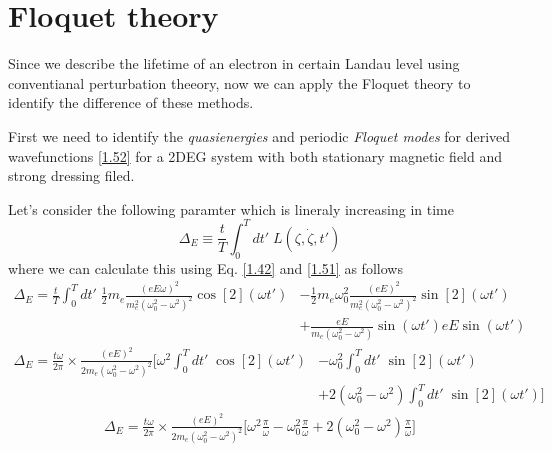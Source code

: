 \section{Floquet theory}

Since we describe the lifetime of an electron in certain Landau level using conventianal perturbation theeory, now we can apply the Floquet theory to identify the difference of these methods.

\noindent
First we need to identify the \textit{quasienergies} and periodic \textit{Floquet modes} for derived wavefunctions \eqref{1.52} for a 2DEG system with both stationary magnetic field and strong dressing filed.

\noindent
Let's consider the following paramter which is lineraly increasing in time
\begin{equation} \label{3.1}
  \Delta_E \equiv \frac{t}{T} \int_0^T dt' \; L(\zeta,\dot{\zeta},t')
\end{equation}
where we can calculate this using Eq. \eqref{1.42} and \eqref{1.51} as follows
\begin{equation} \label{3.2}
  \begin{aligned}
    \Delta_E =
    \frac{t}{T} \int_0^T dt' \;
    \frac{1}{2}m_e \frac{(eE\omega)^2}{m_e^2(\omega_0^2 - \omega^2)^2} \cos[2](\omega t')
    & - \frac{1}{2}m_e\omega_0^2 \frac{(eE)^2}{m_e^2(\omega_0^2 - \omega^2)^2} \sin[2](\omega t') \\
    & +
    \frac{eE}{m_e(\omega_0^2 - \omega^2)} \sin(\omega t') eE \sin(\omega t')
  \end{aligned}
\end{equation}
\begin{equation} \label{3.3}
  \begin{aligned}
    \Delta_E =
    \frac{t\omega}{2\pi} \times
    \frac{(eE)^2}{2m_e(\omega_0^2 - \omega^2)^2}
    \bigg[
    \omega^2
    \int_0^T dt' \; \cos[2](\omega t')
    & -
    \omega_0^2
    \int_0^T dt'\; \sin[2](\omega t') \\
    & +
    2(\omega_0^2 - \omega^2) \int_0^T dt'\; \sin[2](\omega t')
    \bigg]
  \end{aligned}
\end{equation}
\begin{equation} \label{3.4}
  \begin{aligned}
    \Delta_E =
    \frac{t\omega}{2\pi} \times
    \frac{(eE)^2}{2m_e(\omega_0^2 - \omega^2)^2}
    \bigg[
    \omega^2
    \frac{\pi}{\omega}
    -
    \omega_0^2
    \frac{\pi}{\omega}
    +
    2(\omega_0^2 - \omega^2) \frac{\pi}{\omega}
    \bigg]
  \end{aligned}
\end{equation}
